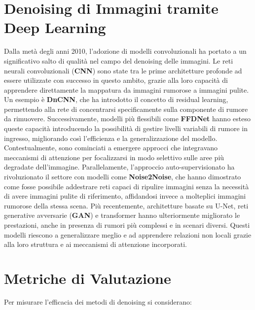 \documentclass[12pt,a4paper,openright,twoside]{book}
\begin{document}
\section{Denoising di Immagini tramite Deep Learning}
Dalla metà degli anni 2010, l'adozione di modelli convoluzionali ha portato a un significativo salto di qualità nel campo del denoising delle immagini. Le reti neurali convoluzionali (\textbf{CNN}) sono state tra le prime architetture profonde ad essere utilizzate con successo in questo ambito, grazie alla loro capacità di apprendere direttamente la mappatura da immagini rumorose a immagini pulite. Un esempio è \textbf{DnCNN}\parencite{zhang2017dncnn}, che ha introdotto il concetto di residual learning, permettendo alla rete di concentrarsi specificamente sulla componente di rumore da rimuovere.
\whiteline
Successivamente, modelli più flessibili come \textbf{FFDNet}\parencite{zhang2018ffdnet} hanno esteso queste capacità introducendo la possibilità di gestire livelli variabili di rumore in ingresso, migliorando così l'efficienza e la generalizzazione del modello. Contestualmente, sono cominciati a emergere approcci che integravano meccanismi di attenzione per focalizzarsi in modo selettivo sulle aree più degradate dell'immagine.
\whiteline
Parallelamente, l'approccio auto-supervisionato ha rivoluzionato il settore con modelli come   \textbf{Noise2Noise}\parencite{lehtinen2018noise2noise}, che hanno dimostrato come fosse possibile addestrare reti capaci di ripulire immagini senza la necessità di avere immagini pulite di riferimento, affidandosi invece a molteplici immagini rumorose della stessa scena.
\whiteline
Più recentemente, architetture basate su U-Net, reti generative avversarie (\textbf{GAN}) e transformer hanno ulteriormente migliorato le prestazioni, anche in presenza di rumori più complessi e in scenari diversi\parencite{9010324}. Questi modelli riescono a generalizzare meglio e ad apprendere relazioni non locali grazie alla loro struttura e ai meccanismi di attenzione incorporati.
\section{Metriche di Valutazione}
Per misurare l'efficacia dei metodi di denoising si considerano:
\end{document}
